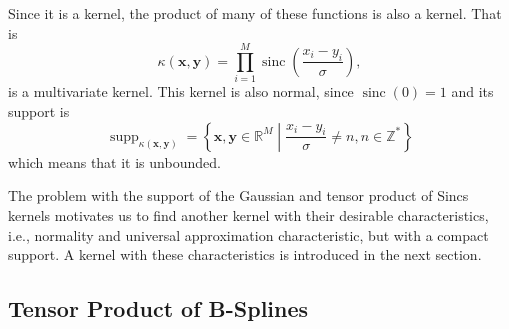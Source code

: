 Since it is a kernel, the product of many of these functions is also a kernel. That is
\begin{equation}
    \kappa(\mathbf{x},\mathbf{y}) = \prod_{i=1}^M \operatorname{sinc}\left( \frac{x_i-y_i}{\sigma} \right),
\end{equation}
is a multivariate kernel. This kernel is also normal, since $\operatorname{sinc}(0) = 1$ and its support is
\begin{equation}
    \operatorname{supp}_{\kappa(\mathbf{x},\mathbf{y})} = \left\{ \mathbf{x},\mathbf{y}\in \mathbb{R}^M \middle| \frac{x_i- y_i}{\sigma} \neq n, n \in \mathbb{Z}^* \right\}
\end{equation}
which means that it is unbounded.

The problem with the support of the Gaussian and tensor product of Sincs kernels motivates us to find another kernel with their desirable characteristics, i.e., normality and universal approximation characteristic, but with a compact support. A kernel with these characteristics is introduced in the next section.

\subsection{Tensor Product of B-Splines}

